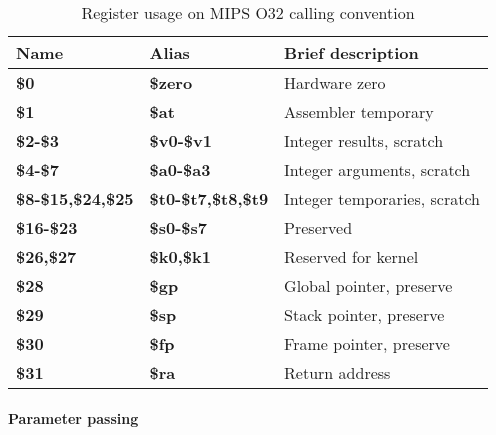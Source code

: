 \begin{table}[h]
\begin{tabular*}{0.95\textwidth}{lll}
Name                                   & Alias                     & Brief description\\
\hline                                                             
{\bf \$0}                              & {\bf \$zero}              & Hardware zero \\
{\bf \$1}                              & {\bf \$at}                & Assembler temporary \\
{\bf \$2-\$3}                          & {\bf \$v0-\$v1}           & Integer results, scratch \\
{\bf \$4-\$7}                          & {\bf \$a0-\$a3}           & Integer arguments, scratch\\
{\bf \$8-\$15,\$24,\$25}               & {\bf \$t0-\$t7,\$t8,\$t9} & Integer temporaries, scratch \\
{\bf \$16-\$23}                        & {\bf \$s0-\$s7}           & Preserved \\
{\bf \$26,\$27}                        & {\bf \$k0,\$k1}           & Reserved for kernel \\
{\bf \$28}                             & {\bf \$gp}                & Global pointer, preserve \\
{\bf \$29}                             & {\bf \$sp}                & Stack pointer, preserve \\
{\bf \$30}                             & {\bf \$fp}                & Frame pointer, preserve \\
{\bf \$31}                             & {\bf \$ra}                & Return address \\


\end{tabular*}
\caption{Register usage on MIPS O32 calling convention}
\end{table}

\paragraph{Parameter passing}

